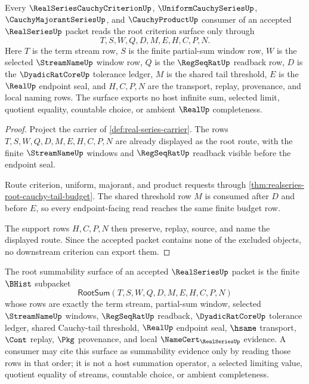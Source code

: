 \begin{theorem}
\label{thm:realseries-root-series-criterion-surface}
Every $\RealSeriesCauchyCriterionUp$, $\UniformCauchySeriesUp$, $\CauchyMajorantSeriesUp$, and $\CauchyProductUp$ consumer of an accepted $\RealSeriesUp$ packet reads the root criterion surface only through
$$
T,S,W,Q,D,M,E,H,C,P,N .
$$
Here $T$ is the term stream row, $S$ is the finite partial-sum window row, $W$ is the selected $\StreamNameUp$ window row, $Q$ is the $\RegSeqRatUp$ readback row, $D$ is the $\DyadicRatCoreUp$ tolerance ledger, $M$ is the shared tail threshold, $E$ is the $\RealUp$ endpoint seal, and $H,C,P,N$ are the transport, replay, provenance, and local naming rows. The surface exports no host infinite sum, selected limit, quotient equality, countable choice, or ambient $\RealUp$ completeness.
\end{theorem}
\begin{proof}
Project the carrier of \autoref{def:real-series-carrier}. The rows $T,S,W,Q,D,M,E,H,C,P,N$ are already displayed as the root route, with the finite $\StreamNameUp$ windows and $\RegSeqRatUp$ readback visible before the endpoint seal.

Route criterion, uniform, majorant, and product requests through \autoref{thm:realseries-root-cauchy-tail-budget}. The shared threshold row $M$ is consumed after $D$ and before $E$, so every endpoint-facing read reaches the same finite budget row.

The support rows $H,C,P,N$ then preserve, replay, source, and name the displayed route. Since the accepted packet contains none of the excluded objects, no downstream criterion can export them.
\end{proof}

\begin{definition}
\label{def:realseries-root-summability-surface}
The root summability surface of an accepted $\RealSeriesUp$ packet is the finite $\BHist$ subpacket
$$
\mathsf{RootSum}(T,S,W,Q,D,M,E,H,C,P,N)
$$
whose rows are exactly the term stream, partial-sum window, selected $\StreamNameUp$ windows, $\RegSeqRatUp$ readback, $\DyadicRatCoreUp$ tolerance ledger, shared Cauchy-tail threshold, $\RealUp$ endpoint seal, $\hsame$ transport, $\Cont$ replay, $\Pkg$ provenance, and local $\NameCert_{\RealSeriesUp}$ evidence. A consumer may cite this surface as summability evidence only by reading those rows in that order; it is not a host summation operator, a selected limiting value, quotient equality of streams, countable choice, or ambient completeness.
\end{definition}

